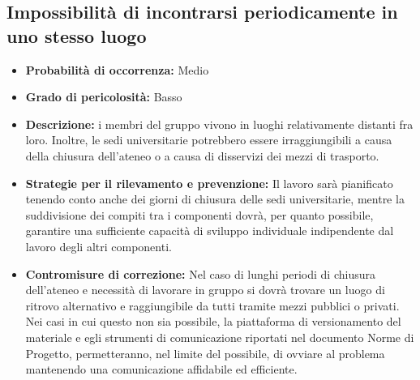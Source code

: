 \subsection{Impossibilità di incontrarsi periodicamente in uno stesso luogo}
\begin{itemize}
\item \textbf{Probabilità di occorrenza:} Medio
\item \textbf{Grado di pericolosità:} Basso
\item \textbf{Descrizione:} i membri del gruppo vivono in luoghi relativamente distanti fra loro. Inoltre, le sedi universitarie potrebbero essere irraggiungibili a causa della chiusura dell'ateneo o a causa di disservizi dei mezzi di trasporto.

\item \textbf{Strategie per il rilevamento e prevenzione:}  Il lavoro sarà pianificato tenendo conto anche dei giorni di chiusura delle sedi universitarie, mentre la suddivisione dei compiti tra i componenti dovrà, per quanto possibile, garantire una sufficiente capacità di sviluppo individuale indipendente dal lavoro degli altri componenti. 

\item \textbf{Contromisure di correzione:} Nel caso di lunghi periodi di chiusura dell'ateneo e necessità di lavorare in gruppo si dovrà trovare un luogo di ritrovo alternativo e raggiungibile da tutti tramite mezzi pubblici o privati. Nei casi in cui questo non sia possibile, la piattaforma di versionamento del materiale e egli strumenti di comunicazione riportati nel documento Norme di Progetto, permetteranno, nel limite del possibile, di ovviare al problema mantenendo una comunicazione affidabile ed efficiente.
\end{itemize}

\newpage